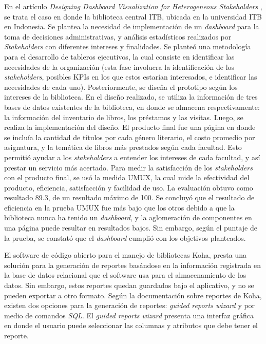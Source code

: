 \documentclass[spanish]{ieee_upb}
\begin{document}


En el artículo \textit{Designing Dashboard Visualization for
Heterogeneous Stakeholders} \cite{DashboardHeterogeneous}, se trata el caso en donde la biblioteca central ITB, ubicada en la universidad ITB en Indonesia. Se plantea la necesidad de implementación de un \textit{dashboard} para la toma de decisiones administrativas, y análisis estadísticos realizados por \textit{Stakeholders} con diferentes intereses y finalidades\cite{MeaningHeterogeneousStakeholders}. Se planteó una metodología para el desarrollo de tableros ejecutivos, la cual consiste en identificar las necesidades de la organización (esta fase involucra la identificación de los \textit{stakeholders}, posibles KPIs en los que estos estarían interesados, e identificar las necesidades de cada uno). Posteriormente, se diseña el prototipo según los intereses de la biblioteca. En el diseño realizado, se utiliza la información de tres bases de datos existentes de la biblioteca, en donde se almacena respectivamente: la información del inventario de libros, los préstamos y las visitas. Luego, se realiza la implementación del diseño. El producto final fue una página en donde se incluía la cantidad de títulos por cada género literario, el costo promedio por asignatura, y la temática de libros más prestados según cada facultad.
Esto permitió ayudar a los \textit{stakeholders} a entender los intereses de cada facultad, y así prestar un servicio más acertado\cite{DashboardHeterogeneous}.
Para medir la satisfacción de los \textit{stakeholders} con el producto final, se usó la medida UMUX, la cual mide la efectividad del producto, eficiencia, satisfacción y facilidad de uso. La evaluación obtuvo como resultado 89.3, de un resultado máximo de 100. Se concluyó que el resultado de eficiencia en la prueba UMUX fue más bajo que los otros debido a que la biblioteca nunca ha tenido un \textit{dashboard}, y la aglomeración de componentes en una página puede resultar en resultados bajos. Sin embargo, según el puntaje de la prueba, se constató que el  \textit{dashboard} cumplió con los objetivos planteados.\cite{DashboardHeterogeneous}

El software de código abierto para el manejo de bibliotecas Koha\cite{KOHA}, presta una solución para la generación de reportes basándose en la información registrada en la base de datos relacional que el software usa para el almacenamiento de los datos\cite{koha_manual_custom_reports}. Sin embargo, estos reportes quedan guardados bajo el aplicativo, y no se pueden exportar a otro formato. Según la documentación sobre reportes de Koha\cite{koha_manual_custom_reports}, existen dos opciones para la generación de reportes: \textit{guided reports wizard} y por medio de comandos \textit{SQL}. El \textit{guided reports wizard} presenta una interfaz gráfica en donde el usuario puede seleccionar las columnas y atributos que debe tener el reporte.
\end{document}
